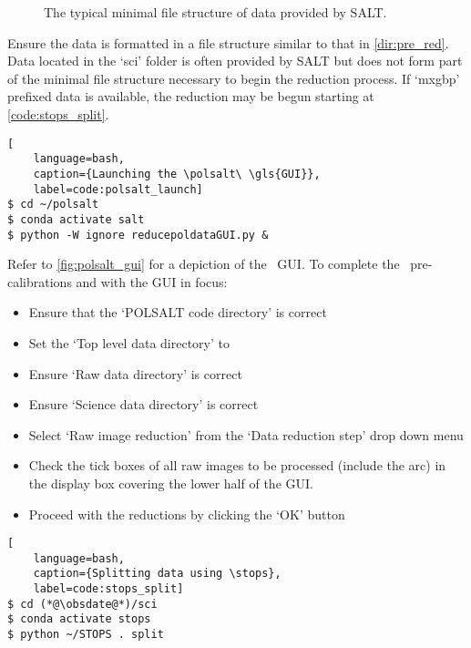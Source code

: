 \begin{figure}[h!]
    \centering
    \begin{minipage}{8cm}
    \end{minipage}
    \caption{The typical minimal file structure of data provided by \gls{SALT}.}
    \label{dir:pre_red}
\end{figure}

Ensure the data is formatted in a file structure similar to that in \autoref{dir:pre_red}. Data located in the `sci' folder is often provided by \gls{SALT} but does not form part of the minimal file structure necessary to begin the reduction process. If `mxgbp' prefixed data is available, the reduction may be begun starting at \autoref{code:stops_split}.

\begin{lstlisting}[
    language=bash,
    caption={Launching the \polsalt\ \gls{GUI}},
    label=code:polsalt_launch]
$ cd ~/polsalt
$ conda activate salt
$ python -W ignore reducepoldataGUI.py &
\end{lstlisting}

Refer to \autoref{fig:polsalt_gui} for a depiction of the \polsalt\ \gls{GUI}. To complete the \polsalt\ pre-calibrations and with the \gls{GUI} in focus:
\begin{itemize}
    \item Ensure that the `POLSALT code directory' is correct
    \item Set the `Top level data directory' to \obsdate
    \item Ensure `Raw data directory' is correct
    \item Ensure `Science data directory' is correct
    \item Select `Raw image reduction' from the `Data reduction step' drop down menu
    \item Check the tick boxes of all raw images to be processed (include the arc) in the display box covering the lower half of the \gls{GUI}.
    \item Proceed with the reductions by clicking the `OK' button
\end{itemize}

\begin{lstlisting}[
    language=bash,
    caption={Splitting data using \stops},
    label=code:stops_split]
$ cd (*@\obsdate@*)/sci
$ conda activate stops
$ python ~/STOPS . split
\end{lstlisting}

